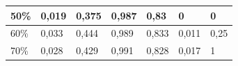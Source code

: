 \documentclass{classrep}
\begin{document}
{\begin{table}[h]
\begin{center}
\begin{tabular}{|l|l|l|l|l|l|l|}
50\%                                                              & 0,019                                                                     & 0,375                                                                      & 0,987                                                          & 0,83                                                              & 0                                                                 & 0                                                                    \\ \hline
60\%                                                              & 0,033                                                                     & 0,444                                                                      & 0,989                                                          & 0,833                                                             & 0,011                                                             & 0,25                                                                 \\ \hline
70\%                                                              & 0,028                                                                     & 0,429                                                                      & 0,991                                                          & 0,828                                                             & 0,017                                                             & 1                                                                    \\ \hline
\end{tabular}
\end{center}
\end{table}

}
\end{document}
